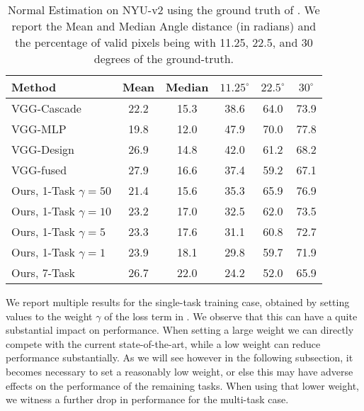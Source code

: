 \documentclass[10pt,twocolumn,letterpaper]{article}
\begin{document}
 \newcommand{\hsp}{\hspace{5pt}}
 \newcommand{\hsps}{\hspace{2pt}}
  \begin{table}[!h]
 	\begin{center}

 			\begin{tabular}{|l|c @{\hsps} c @{\hsps} c @{\hsp} c @{\hsp} c|}
 				\hline		 
 			Method	&  Mean &  Median &  $11.25^{\circ}$ & $22.5^{\circ}$ & $30^{\circ}$  \\\hline\hline
				 VGG-Cascade \cite{Eigen15} &  22.2 & 15.3& 38.6 & 64.0 & 73.9\\\hline
 				VGG-MLP \cite{BansalRG16} & 	19.8 & 12.0  & 47.9 & 70.0 & 77.8 \\\hline
 				VGG-Design \cite{WangFG15} & 26.9 & 14.8 & 42.0 & 61.2 & 68.2 \\\hline
 				VGG-fused \cite{WangFG15} & 27.9 & 16.6 & 37.4  & 59.2 & 67.1 \\\hline
 				Ours, 1-Task $\gamma=50$	&	21.4 & 15.6 &  35.3 & 65.9 & 76.9\\\hline
 				Ours, 1-Task $\gamma=10$  & 23.2 & 17.0 & 32.5 & 62.0 & 73.5\\\hline
 				Ours, 1-Task $\gamma=5$	& 23.3 & 17.6 & 31.1 & 60.8 & 72.7\\\hline
 				Ours, 1-Task $\gamma=1$ &  23.9 		& 18.1  & 29.8 & 59.7 & 71.9\\\hline
 				Ours, 7-Task 	& 26.7 & 22.0  & 24.2 & 52.0 & 65.9\\\hline
 			\end{tabular}

 	\end{center}
 	\caption{Normal Estimation on  NYU-v2  using the ground truth of \cite{LadickyZP14}. We report the Mean and Median Angle distance (in radians) and the percentage of valid pixels being with 11.25, 22.5, and 30 degrees of the ground-truth.}
 \end{table}
 
 We report multiple results for the single-task training case, obtained by setting values to the weight $\gamma$ of the loss term in . We observe that this can have a quite substantial impact on performance. When setting a large weight we can directly compete with the current state-of-the-art, while a low weight can reduce performance substantially. As we will see however in the following subsection, it becomes necessary to set a reasonably low weight, or else this may have adverse effects on the performance of the remaining tasks. When using that lower weight, we witness a further drop in performance for the multi-task case.
 
\end{document}
